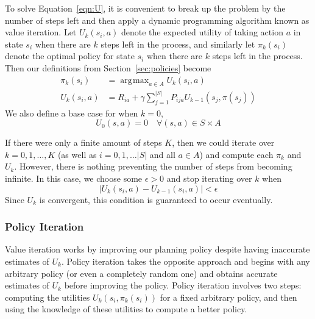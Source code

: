 \documentclass[tog]{acmsiggraph}
\DeclareMathOperator*{\argmax}{\arg\!\max}
\begin{document}
To solve Equation~\ref{eqn:U}, it is convenient to break up the problem by the number 
of steps left and then apply a dynamic programming algorithm known as value iteration. 
Let $U_k \left( s_i, a \right)$ denote the expected utility of taking action $a$ 
in state $s_i$ when there are $k$ steps left in the process, and similarly let 
$\pi_k \left(s_i \right)$ denote the optimal policy for state $s_i$ when there are $k$ steps 
left in the process. Then our definitions from Section~\ref{sec:policies} become
\begin{equation*}
  \begin{split}
    \pi_k \left(s_i \right) &= \argmax_{a \in A} U_k \left( s_i, a \right) \\
    U_k \left( s_i, a \right) &= R_{ia} + \gamma \sum_{j=1}^{\left| S \right|} P_{ija} U_{k-1} \left( s_j, \pi \left( s_j \right) \right)
  \end{split}
\end{equation*}
We also define a base case for when $k=0$,
\begin{equation*}
  U_0 \left( s, a \right) = 0 \quad \forall \left( s, a \right) \in S \times A
\end{equation*}

If there were only a finite amount of steps $K$, then we could iterate over $k = 0, 1, \ldots, K$ 
(as well as $i = 0, 1, \ldots |S|$ and all $a \in A$) and compute each $\pi_k$ and $U_k$. 
However, there is nothing preventing the number of steps from becoming infinite. 
In this case, we choose some $\epsilon > 0$ and stop iterating over $k$ when
\begin{equation*}
  \left| U_k\left( s_i, a \right) - U_{k-1}\left( s_i, a \right) \right| < \epsilon
\end{equation*}
Since $U_k$ is convergent, this condition is guaranteed to occur eventually.

\subsubsection{Policy Iteration}
\label{sec:policyIteration}

Value iteration works by improving our planning policy despite having inaccurate 
estimates of $U_k$. Policy iteration takes the opposite approach and begins with 
any arbitrary policy (or even a completely random one) and obtains accurate estimates 
of $U_k$ before improving the policy. Policy iteration involves two steps: computing 
the utilities $U_k \left(s_i, \pi_k \left(s_i \right) \right)$ for a fixed arbitrary policy, and then 
using the knowledge of these utilities to compute a better policy.
\end{document}
